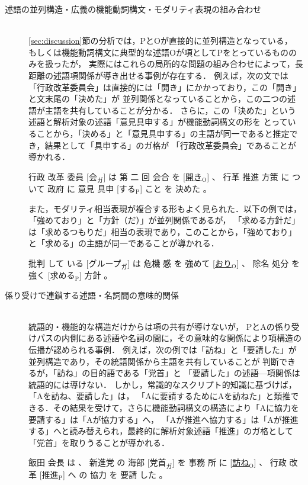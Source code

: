 \documentclass[japanese]{jnlp_1.4}
\begin{document}
\begin{description}
 \item[述語の並列構造・広義の機能動詞構文・モダリティ表現の組み合わせ]\mbox{}\\
 \ref{sec:discussion}節の分析では，PとOが直接的に並列構造となっている，
 もしくは機能動詞構文に典型的な述語Oが項としてPをとっているもののみを扱ったが，
 実際にはこれらの局所的な問題の組み合わせによって，長距離の述語項関係が導き出せる事例が存在する．
 例えば，次の文では「行政改革委員会」は直接的には「開き」にかかっており，この「開き」と文末尾の「決めた」が
 並列関係となっていることから，この二つの述語が主語を共有していることが分かる．
 さらに，この「決めた」という述語と解析対象の述語「意見具申する」が機能動詞構文の形を
 とっていることから，「決める」と「意見具申する」の主語が同一であると推定でき，結果として「具申する」のガ格が
 「行政改革委員会」であることが導かれる．
\begin{screen}
 行政 改革 委員 [会$_\text{ガ}$] は 第 二 回 会合 を [\ul{開き}$_\mathrm{O}$] 、 行革 推進 方策 に ついて 政府 に 意見 具申 [する$_\mathrm{P}$] こと を 決めた 。
\end{screen}
また，モダリティ相当表現が複合する形もよく見られた．以下の例では，「強めており」と「方針（だ）」が並列関係であるが，
「求める方針だ」は「求めるつもりだ」相当の表現であり，このことから，「強めており」と「求める」の主語が同一であることが導かれる．
\begin{screen}
批判 して いる [グループ$_\text{ガ}$] は 危機 感 を 強めて [\ul{おり}$_\mathrm{O}$] 、 除名 処分 を 強く [求める$_\mathrm{P}$] 方針 。
\end{screen}

 \item[係り受けで連鎖する述語・名詞間の意味的関係]\mbox{}\\
 統語的・機能的な構造だけからは項の共有が導けないが，
 PとAの係り受けパスの内側にある述語や名詞の間に，その意味的な関係により項構造の伝播が認められる事例．
 例えば，次の例では「訪ね」と「要請した」が並列構造であり，その統語関係から主語を共有していることが
 判断できるが，「訪ね」の目的語である「党首」と 「要請した」の述語—項関係は統語的には導けない．
 しかし，常識的なスクリプト的知識に基づけば，「Aを訪ね、要請した」は，
 「Aに要請するためにAを訪ねた」と類推できる．その結果を受けて，さらに機能動詞構文の構造により「Aに協力を要請する」は「Aが協力する」へ，
 「Aが推進へ協力する」は「Aが推進する」へと読み替えられ，最終的に解析対象述語「推進」のガ格として「党首」を取りうることが導かれる．
\begin{screen}
飯田 会長 は 、 新進党 の 海部 [党首$_\text{ガ}$] を 事務 所 に [\ul{訪ね}$_\mathrm{O}$] 、 行政 改革 [推進$_\mathrm{P}$] へ の 協力 を 要請 した 。
\end{screen}


\end{description}
\end{document}
